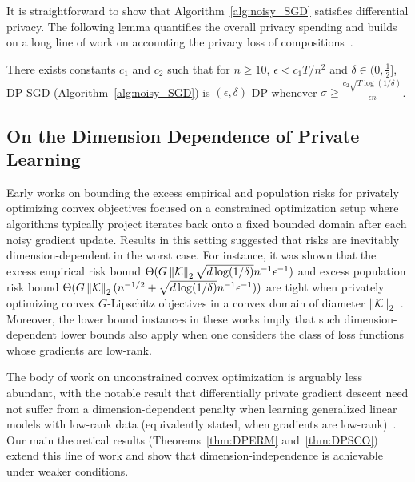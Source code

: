 It is straightforward to show that Algorithm~\ref{alg:noisy_SGD} satisfies differential privacy. 
The following lemma quantifies the overall privacy spending and builds on a long line of work on accounting the privacy loss of compositions~\citep{abadi2016deep,balle2018privacy}.
\begin{lemm}
\label{lm:privacy_guarantee}
There exists constants $c_1$ and $c_2$ such that for $n\geq10$, $\epsilon< c_1 T/n^2$ and $\delta \in (0, \frac{1}{2}]$, DP-SGD (Algorithm~\ref{alg:noisy_SGD}) is $(\epsilon,\delta)$-DP whenever $\sigma \ge \frac{c_2 \sqrt{T\log(1/\delta)}}{\epsilon n}$.
\end{lemm}

\subsection{On the Dimension Dependence of Private Learning}
Early works on bounding the excess empirical and population risks for privately optimizing convex objectives focused on a constrained optimization setup where algorithms typically project iterates back onto a fixed bounded domain after each noisy gradient update. 
Results in this setting suggested that risks are inevitably dimension-dependent in the worst case.
For instance, it was shown that the excess empirical risk bound $\Theta (  G \left\lVert\mathcal K\right\rVert_2 \sqrt{d\log(1/\delta)} n^{-1} \epsilon^{-1} )$ and excess population risk bound $\Theta ( G \left\lVert\mathcal K\right\rVert_2 ( n^{-1/2} + \sqrt {d \log(1/\delta) } n^{-1} \epsilon^{-1} ) )$ are tight when privately optimizing convex $G$-Lipschitz objectives in a convex domain of diameter $\left\lVert\mathcal K\right\rVert_2$~\citep{bassily2014private}.
Moreover, the lower bound instances in these works imply that such dimension-dependent lower bounds also apply when one considers the class of loss functions whose gradients are low-rank.

The body of work on unconstrained convex optimization is arguably less abundant, with the notable result that differentially private gradient descent need not suffer from a dimension-dependent penalty when learning generalized linear models with low-rank data (equivalently stated, when gradients are low-rank)~\citep{song2021evading}.
Our main theoretical results (Theorems~\ref{thm:DPERM} and~\ref{thm:DPSCO}) extend this line of work and show that dimension-independence is achievable under weaker conditions.

